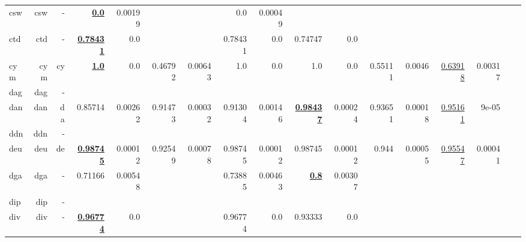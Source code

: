 \documentclass[11pt]{article}
\begin{document}
\begin{table*}[h]
{\begin{tabular}{lrrrrrrrrrrrrrrrr}
csw         & csw         & -         & \textbf{\underline{0.0}}         & 0.00199         &          &          & 0.0         & 0.00049         &          &          &          &          &          &          \\
ctd         & ctd         & -         & \textbf{\underline{0.78431}}         & 0.0         &          &          & 0.78431         & 0.0         & 0.74747         & 0.0         &          &          &          &          \\
cym         & cym         & cy         & \textbf{\underline{1.0}}         & 0.0         & 0.46792         & 0.00643         & 1.0         & 0.0         & 1.0         & 0.0         & 0.55111         & 0.0046         & \underline{0.63918}         & 0.00317         \\
dag         & dag         & -         &          &          &          &          &          &          &          &          &          &          &          &          \\
dan         & dan         & da         & 0.85714         & 0.00262         & 0.91473         & 0.00032         & 0.91304         & 0.00146         & \textbf{\underline{0.98437}}         & 0.00024         & 0.93651         & 0.00018         & \underline{0.95161}         & 9e-05         \\
ddn         & ddn         & -         &          &          &          &          &          &          &          &          &          &          &          &          \\
deu         & deu         & de         & \textbf{\underline{0.98745}}         & 0.00012         & 0.92549         & 0.00078         & 0.98745         & 0.00012         & 0.98745         & 0.00012         & 0.944         & 0.00055         & \underline{0.95547}         & 0.00041         \\
dga         & dga         & -         & 0.71166         & 0.00548         &          &          & 0.73885         & 0.00463         & \textbf{\underline{0.8}}         & 0.00307         &          &          &          &          \\
dip         & dip         & -         &          &          &          &          &          &          &          &          &          &          &          &          \\
div         & div         & -         & \textbf{\underline{0.96774}}         & 0.0         &          &          & 0.96774         & 0.0         & 0.93333         & 0.0         &          &          &          &          \\

\end{tabular}}
\end{table*}
\end{document}
